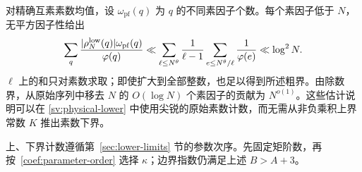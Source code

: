 对精确互素素数均值，设 $\omega_{\mathrm{pf}}(q)$ 为 $q$ 的不同素因子个数。每个素因子低于 $N$，无平方因子性给出
\begin{equation}\label{sv:coprime-prime-error}
 \sum_q\frac{|\rho_N^{\rm low}(q)|\omega_{\mathrm{pf}}(q)}{\varphi(q)}
 \ll\sum_{\ell\le N^\theta}\frac1{\ell-1}
                  \sum_{e\le N^\theta/\ell}\frac1{\varphi(e)}
 \ll\log^2N.
\end{equation}
$\ell$ 上的和只对素数求取；即使扩大到全部整数，也足以得到所述粗界。由除数界，从原始序列中移去 $N$ 的 $O(\log N)$ 个素因子的贡献为 $N^{o(1)}$。这些估计说明可以在 \eqref{sv:physical-lower} 中使用尖锐的原始素数计数，而无需从非负乘积上界常数 $K$ 推出素数下界。

上、下界计数遵循第~\ref{sec:lower-limits} 节的参数次序。先固定矩阶数，再按~\eqref{coef:parameter-order} 选择 $\kappa$；边界指数仍满足上述 $B>A+3$。